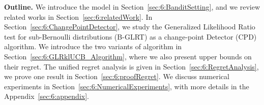 



\textbf{Outline.}
%
We introduce the model in Section~\ref{sec:6:BanditSetting}, and we review related works in Section~\ref{sec:6:relatedWork}.
In Section~\ref{sec:6:ChangePointDetector}, we study the Generalized Likelihood Ratio test for sub-Bernoulli distributions (B-GLRT) as a change-point Detector (CPD) algorithm.
We introduce the two variants of \GLRklUCB{} algorithm in Section~\ref{sec:6:GLRklUCB_Algorithm}, where we also present upper bounds on their regret.
The unified regret analysis is given in Section~\ref{sec:6:RegretAnalysis}, we prove one result in Section~\ref{sec:6:proofRegret}.
We discuss numerical experiments in Section~\ref{sec:6:NumericalExperiments}, with more details in the Appendix~\ref{sec:6:appendix}.

